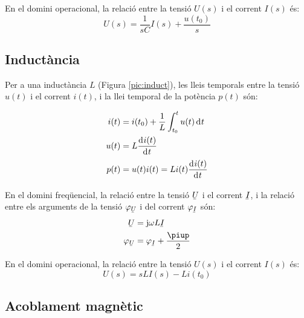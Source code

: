 En el domini operacional, la relaci\'{o} entre la tensi\'{o} $U(s)$ i el corrent $I(s)$ \'{e}s:
\begin{equation}
   U(s) = \frac{1}{s C} I(s) + \frac{u(t_0)}{s}
\end{equation}


\subsection{Induct\`{a}ncia} 

Per a una induct\`{a}ncia $L$ (Figura \vref{pic:induct}),
les lleis temporals entre la tensi\'{o} $u(t)$ i el corrent $i(t)$, i la llei temporal
de la pot\`{e}ncia $p(t)$ s\'{o}n:

\hfill
\begin{minipage}[b]{5cm}
    
    \label{pic:induct}
\end{minipage}
\hfill
\begin{minipage}[b][3.8cm][t]{8cm}
   \begin{align}
      i(t) &= i(t_0) + \frac{1}{L} \int_{t_0}^t u(t) \diff t \\
      u(t) &= L \deriv{i(t)}{t} \\
      p(t) &= u(t) i(t) = L i(t) \deriv{i(t)}{t}
   \end{align}
\end{minipage}

En el domini freq\"{u}encial, la relaci\'{o} entre la tensi\'{o} $\cmplx{U}$ i el corrent $\cmplx{I}$, i la relaci\'{o} entre els arguments de la tensi\'{o} $\varphi_{\cmplx{U}}$ i del corrent $\varphi_{\cmplx{I}}$ s\'{o}n:
\begin{align}
   \cmplx{U} &= \ju \omega L \cmplx{I} \\
   \varphi_{\cmplx{U}} &= \varphi_{\cmplx{I}} + \frac{\piup}{2}
\end{align}

 En el domini operacional, la relaci\'{o} entre la tensi\'{o} $U(s)$ i el corrent $I(s)$ \'{e}s:
\begin{equation}
   U(s) = s L I(s) - L i(t_0)
\end{equation}


\subsection{Acoblament magn\`{e}tic} 

